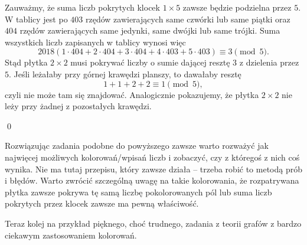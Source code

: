 \begin{center}
\end{center}

\noindent
Zauważmy, że suma liczb pokrytych klocek $1 \times 5$ zawsze będzie podzielna przez $5$. W tablicy jest po $403$ rzędów zawierających same czwórki lub same piątki oraz $404$ rzędów zawierających same jedynki, same dwójki lub same trójki. Suma wszystkich liczb zapisanych w tablicy wynosi więc
\[
	2018( 1 \cdot 404 + 2\cdot 404 + 3 \cdot 404 + 4 \cdot 403 + 5 \cdot 403) \equiv 3 \pmod{5}.
\] 
Stąd płytka $2\times2$ musi pokrywać liczby o sumie dającej resztę $3$ z dzielenia przez $5$. Jeśli leżałaby przy górnej krawędzi planszy, to dawałaby resztę
\[
	1 + 1 + 2 + 2 \equiv 1 \pmod{5},
\]
czyli nie może tam się znajdować. Analogicznie pokazujemy, że płytka $2 \times 2$ nie leży przy żadnej z pozostałych krawędzi.

\qed

\noindent
Rozwiązując zadania podobne do powyższego zawsze warto rozważyć jak najwięcej możliwych kolorowań/wpisań liczb i zobaczyć, czy z któregoś z nich coś wynika. Nie ma tutaj przepisu, który zawsze działa -- trzeba robić to metodą prób i błędów. Warto zwrócić szczególną uwagę na takie kolorowania, że rozpatrywana płytka zawsze pokrywa tę samą liczbę pokolorowanych pól lub suma liczb pokrytych przez klocek zawsze ma pewną właściwość.

\vspace{10px}
\noindent
Teraz kolej na przykład pięknego, choć trudnego, zadania z teorii grafów z bardzo ciekawym zastosowaniem kolorowań.

\vspace{10px}

